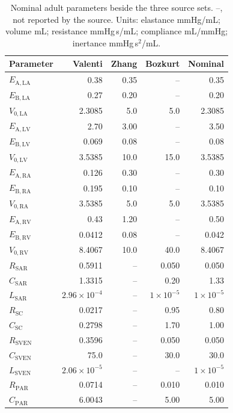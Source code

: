 \documentclass{article}
\begin{document}
\begin{table}[H]
\centering\small
\setlength{\tabcolsep}{3pt}
\caption{Nominal adult parameters beside the three source sets. --, not reported by the source. Units: elastance mmHg/mL; volume mL; resistance mmHg\,s/mL; compliance mL/mmHg; inertance mmHg\,s$^2$/mL.}
\label{tab:S-sources}
\begin{tabular}{lrrrr}
\toprule
\textbf{Parameter} & \textbf{Valenti} & \textbf{Zhang} & \textbf{Bozkurt} & \textbf{Nominal} \\
\midrule
$E_{\mathrm{A,LA}}$ & 0.38 & 0.35 & -- & 0.35 \\
$E_{\mathrm{B,LA}}$ & 0.27 & 0.20 & -- & 0.20 \\
$V_{0,\mathrm{LA}}$ & 2.3085 & 5.0 & 5.0 & 2.3085 \\
$E_{\mathrm{A,LV}}$ & 2.70 & 3.00 & -- & 3.50 \\
$E_{\mathrm{B,LV}}$ & 0.069 & 0.08 & -- & 0.08 \\
$V_{0,\mathrm{LV}}$ & 3.5385 & 10.0 & 15.0 & 3.5385 \\
$E_{\mathrm{A,RA}}$ & 0.126 & 0.30 & -- & 0.30 \\
$E_{\mathrm{B,RA}}$ & 0.195 & 0.10 & -- & 0.10 \\
$V_{0,\mathrm{RA}}$ & 3.5385 & 5.0 & 5.0 & 3.5385 \\
$E_{\mathrm{A,RV}}$ & 0.43 & 1.20 & -- & 0.50 \\
$E_{\mathrm{B,RV}}$ & 0.0412 & 0.08 & -- & 0.042 \\
$V_{0,\mathrm{RV}}$ & 8.4067 & 10.0 & 40.0 & 8.4067 \\
$R_{\mathrm{SAR}}$ & 0.5911 & -- & 0.050 & 0.050 \\
$C_{\mathrm{SAR}}$ & 1.3315 & -- & 0.20 & 1.33 \\
$L_{\mathrm{SAR}}$ & $2.96\times10^{-4}$ & -- & $1\times10^{-5}$ & $1\times10^{-5}$ \\
$R_{\mathrm{SC}}$ & 0.0217 & -- & 0.95 & 0.80 \\
$C_{\mathrm{SC}}$ & 0.2798 & -- & 1.70 & 1.00 \\
$R_{\mathrm{SVEN}}$ & 0.3596 & -- & 0.050 & 0.050 \\
$C_{\mathrm{SVEN}}$ & 75.0 & -- & 30.0 & 30.0 \\
$L_{\mathrm{SVEN}}$ & $2.06\times10^{-5}$ & -- & -- & $1\times10^{-5}$ \\
$R_{\mathrm{PAR}}$ & 0.0714 & -- & 0.010 & 0.010 \\
$C_{\mathrm{PAR}}$ & 6.0043 & -- & 5.00 & 5.00 \\

\end{tabular}
\end{table}
\end{document}
